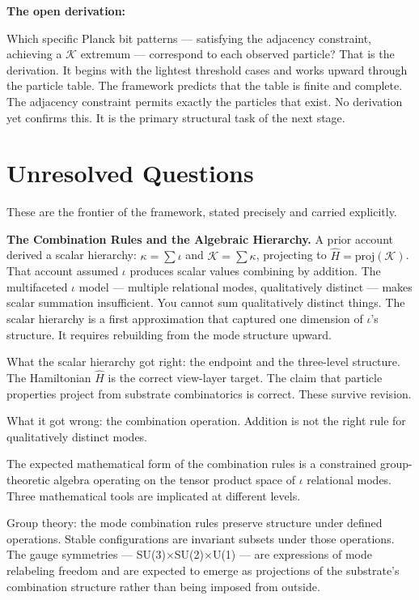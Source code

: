 \documentclass[11pt,letterpaper]{article}
\newcommand{\Kappa}{\mathcal{K}}
\begin{document}
\textbf{The open derivation:}

Which specific Planck bit patterns --- satisfying the adjacency constraint, achieving a \(\Kappa\) extremum --- correspond to each observed particle? That is the derivation. It begins with the lightest threshold cases and works upward through the particle table. The framework predicts that the table is finite and complete. The adjacency constraint permits exactly the particles that exist. No derivation yet confirms this. It is the primary structural task of the next stage.

\section{Unresolved Questions}
\label{sec:orgdf2cecc}

These are the frontier of the framework, stated precisely and carried explicitly.

\textbf{The Combination Rules and the Algebraic Hierarchy.} A prior account derived a scalar hierarchy: \(\kappa = \sum \iota\) and \(\Kappa = \sum \kappa\), projecting to \(\hat{H} = \mathrm{proj}(\Kappa)\). That account assumed \(\iota\) produces scalar values combining by addition. The multifaceted \(\iota\) model — multiple relational modes, qualitatively distinct — makes scalar summation insufficient. You cannot sum qualitatively distinct things. The scalar hierarchy is a first approximation that captured one dimension of \(\iota\)'s structure. It requires rebuilding from the mode structure upward.

What the scalar hierarchy got right: the endpoint and the three-level structure. The Hamiltonian \(\hat{H}\) is the correct view-layer target. The claim that particle properties project from substrate combinatorics is correct. These survive revision.

What it got wrong: the combination operation. Addition is not the right rule for qualitatively distinct modes.

The expected mathematical form of the combination rules is a constrained group-theoretic algebra operating on the tensor product space of \(\iota\) relational modes. Three mathematical tools are implicated at different levels.

Group theory: the mode combination rules preserve structure under defined operations. Stable configurations are invariant subsets under those operations. The gauge symmetries — SU(3)×SU(2)×U(1) — are expressions of mode relabeling freedom and are expected to emerge as projections of the substrate's combination structure rather than being imposed from outside.
\end{document}

